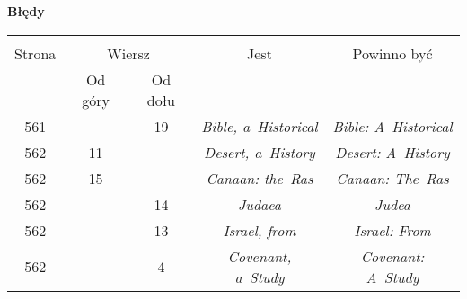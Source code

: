 \documentclass[a4paper,11pt]{article}  %
\newcommand{\tb}{\textbf}
\newcommand{\Center}[1]{\begin{center} #1 \end{center}}
\newcommand{\CenterTB}[1]{\Center{\tb{#1}}}
\begin{document}
\CenterTB{Błędy}
\begin{center}
  \begin{tabular}{|c|c|c|c|c|}
    \hline
    & \multicolumn{2}{c|}{} & & \\
    Strona & \multicolumn{2}{c|}{Wiersz}& Jest & Powinno być \\ \cline{2-3}
    & Od góry & Od dołu &  &  \\ \hline
    561 & & 19 & \emph{Bible, a~Historical}
           & \emph{Bible: A~Historical} \\
    562 & 11 & & \emph{Desert, a~History} & \emph{Desert: A~History} \\
    562 & 15 & & \emph{Canaan: the~Ras} & \emph{Canaan: The~Ras} \\
    562 & & 14 & \emph{Judaea} & \emph{Judea} \\
    562 & & 13 & \emph{Israel, from} & \emph{Israel: From} \\
    562 & &  4 & \emph{Covenant, a~Study} & \emph{Covenant: A~Study} \\
  \end{tabular}
\end{center}
\end{document}
